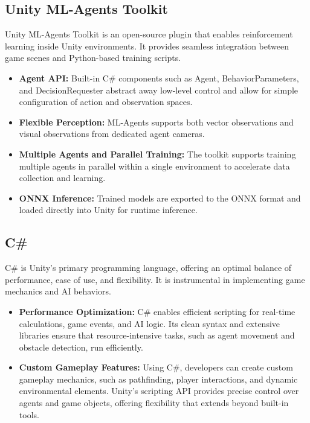 \documentclass[12pt,oneside,openright,a4paper]{cpe-english-project}
\begin{document}

\subsection{Unity ML-Agents Toolkit}
Unity ML-Agents Toolkit is an open-source plugin that enables reinforcement learning inside Unity environments. It provides seamless integration between game scenes and Python-based training scripts.

\begin{itemize}
\item \textbf{Agent API:} Built-in C\# components such as Agent, BehaviorParameters, and DecisionRequester abstract away low-level control and allow for simple configuration of action and observation spaces.
\item \textbf{Flexible Perception:} ML-Agents supports both vector observations and visual observations from dedicated agent cameras.
\item \textbf{Multiple Agents and Parallel Training:} The toolkit supports training multiple agents in parallel within a single environment to accelerate data collection and learning.
\item \textbf{ONNX Inference:} Trained models are exported to the ONNX format and loaded directly into Unity for runtime inference.
\end{itemize}


\subsection{C\#}
C\# is Unity's primary programming language, offering an optimal balance of performance, ease of use, and flexibility. It is instrumental in implementing game mechanics and AI behaviors.
\begin{itemize}
\item  \textbf{Performance Optimization:} C\# enables efficient scripting for real-time calculations, game events, and AI logic. Its clean syntax and extensive libraries ensure that resource-intensive tasks, such as agent movement and obstacle detection, run efficiently.
\item  \textbf{Custom Gameplay Features:} Using C\#, developers can create custom gameplay mechanics, such as pathfinding, player interactions, and dynamic environmental elements. Unity's scripting API provides precise control over agents and game objects, offering flexibility that extends beyond built-in tools.
\end{itemize}
\end{document}
